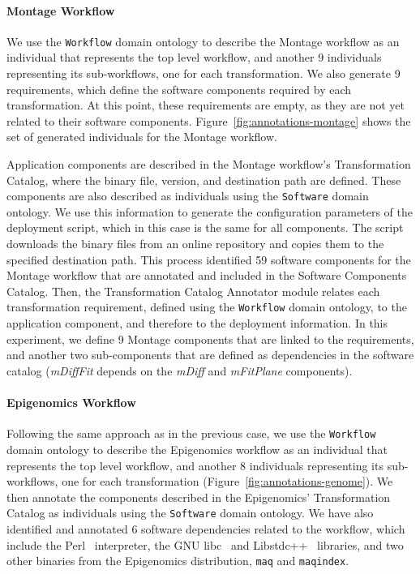 \paragraph{\textbf{Montage Workflow}}
We use the \texttt{Workflow} domain ontology to describe the Montage workflow 
as an individual that represents the top level workflow, and another 9 individuals 
representing its sub-workflows, one for each transformation. We also generate 9 
requirements, which define the software components required by each transformation. 
At this point, these requirements are empty, as they are not yet related to their 
software components. Figure~\ref{fig:annotations-montage} shows the set of 
generated individuals for the Montage workflow.

Application components are described in the Montage workflow's Transformation 
Catalog, where the binary file, version, and destination path are defined. These 
components are also described as individuals using the \texttt{Software} domain 
ontology. We use this information to generate the configuration parameters of the 
deployment script, which in this case is the same for all components. The script 
downloads the binary files from an online repository and copies them to the specified 
destination path. This process identified 59 software components for the Montage 
workflow that are annotated and included in the Software Components Catalog.
Then, the Transformation Catalog Annotator module relates each transformation 
requirement, defined using the \texttt{Workflow} domain ontology, to the application 
component, and therefore to the deployment information. In this experiment, we 
define 9 Montage components that are linked to the requirements, and another two 
sub-components that are defined as dependencies in the software catalog 
(\emph{mDiffFit} depends on the \emph{mDiff} and \emph{mFitPlane} components).


\paragraph{\textbf{Epigenomics Workflow}}
Following the same approach as in the previous case, we use the \texttt{Workflow} 
domain ontology to describe the Epigenomics workflow as an individual that represents 
the top level workflow, and another 8 individuals representing its sub-workflows, one 
for each transformation (Figure~\ref{fig:annotations-genome}). We then annotate 
the components described in the Epigenomics' Transformation Catalog as individuals 
using the \texttt{Software} domain ontology. We have also identified and annotated 6 
software dependencies related to the workflow, which include the Perl~\cite{perl} interpreter, 
the GNU libc~\cite{libc} and Libstdc++~\cite{libstdc} libraries, and two other binaries from 
the Epigenomics  distribution, \texttt{maq} and \texttt{maqindex}.

